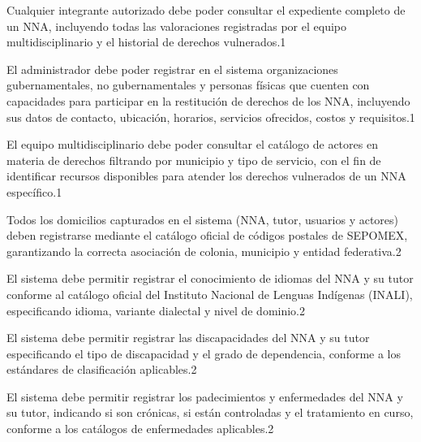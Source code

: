 \begin{requerimientosU}
	{Cualquier integrante autorizado debe poder consultar el expediente 
		completo de un NNA, incluyendo todas las valoraciones registradas 
		por el equipo multidisciplinario y el historial de derechos 
		vulnerados.}{1}{\DONE}
	
	{El administrador debe poder registrar en el sistema organizaciones 
		gubernamentales, no gubernamentales y personas físicas que cuenten 
		con capacidades para participar en la restitución de derechos de los 
		NNA, incluyendo sus datos de contacto, ubicación, horarios, 
		servicios ofrecidos, costos y requisitos.}{1}{\DONE}
	
	{El equipo multidisciplinario debe poder consultar el catálogo de 
		actores en materia de derechos filtrando por municipio y tipo de 
		servicio, con el fin de identificar recursos disponibles para 
		atender los derechos vulnerados de un NNA específico.}{1}{\DONE}
	
	{Todos los domicilios capturados en el sistema (NNA, tutor, usuarios 
		y actores) deben registrarse mediante el catálogo oficial de códigos 
		postales de SEPOMEX, garantizando la correcta asociación de colonia, 
		municipio y entidad federativa.}{2}{\DONE}
	
	{El sistema debe permitir registrar el conocimiento de idiomas del 
		NNA y su tutor conforme al catálogo oficial del Instituto Nacional 
		de Lenguas Indígenas (INALI), especificando idioma, variante 
		dialectal y nivel de dominio.}{2}{\DONE}
	
	{El sistema debe permitir registrar las discapacidades del NNA y su 
		tutor especificando el tipo de discapacidad y el grado de 
		dependencia, conforme a los estándares de clasificación 
		aplicables.}{2}{\DONE}
	
	{El sistema debe permitir registrar los padecimientos y enfermedades 
		del NNA y su tutor, indicando si son crónicas, si están controladas 
		y el tratamiento en curso, conforme a los catálogos de enfermedades 
		aplicables.}{2}{\DONE}
	

\end{requerimientosU}
